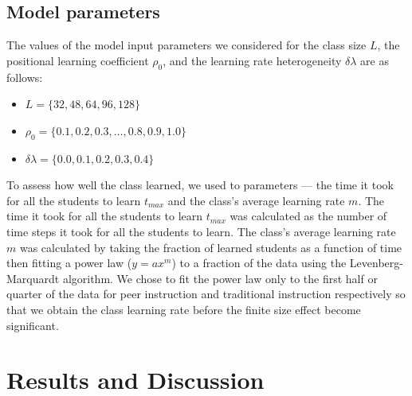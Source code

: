 \documentclass[twocolumn,secnumarabic,amssymb, nobibnotes, aps, prd]{revtex4-2}
\begin{document}
    \subsection{Model parameters}
        The values of the model input parameters we considered for the class size $L$, the positional learning coefficient $\rho_0$, and the learning rate heterogeneity $\delta\lambda$ are as follows:

        \begin{itemize}
            \item $L=\lbrace32,48,64,96,128\rbrace$
            \item $\rho_0=\lbrace0.1, 0.2, 0.3,\dots, 0.8, 0.9, 1.0\rbrace$
            \item $\delta\lambda=\lbrace0.0, 0.1, 0.2, 0.3, 0.4\rbrace$
        \end{itemize}

        To assess how well the class learned, we used to parameters --- the time it took for all the students to learn $t_{max}$ and the class's average learning rate $m$.
        The time it took for all the students to learn $t_{max}$ was calculated as the number of time steps it took for all the students to learn.
        The class's average learning rate $m$ was calculated by taking the fraction of learned students as a function of time then fitting a power law ($y=ax^m$) to a fraction of the data using the Levenberg-Marquardt algorithm.
        We chose to fit the power law only to the first half or quarter of the data for peer instruction and traditional instruction respectively so that we obtain the class learning rate before the finite size effect become significant.

\section{Results and Discussion}

\end{document}

